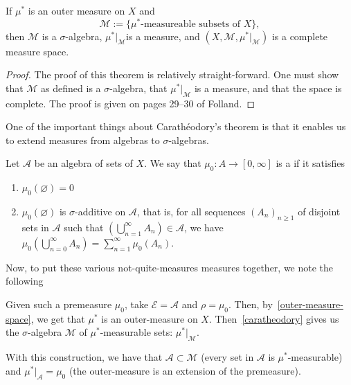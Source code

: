 \documentclass[11pt,leqno,oneside]{amsbook}
\numberwithin{thm}{section}
\renewcommand{\A}{\mathcal{A}} %
\newcommand{\M}{\mathcal{M}} %
\newcommand{\Ep}{\mathcal{E}} %
\newcommand{\s}{$\sigma$-} %
\renewcommand{\emptyset}{\varnothing}
\begin{document}
\begin{thm}[Carathéodory]\label{caratheodory}
  If $\mu^*$ is an outer measure on $X$ and \[
    \M := \{\mu^*\text{-measureable subsets of }X\},
  \]
  then $\M$ is a \s algebra, $\mu^*|_\M$is a measure, and
  $(X,\M,\mu^*|_\M)$ is a complete measure space.
\end{thm}
\begin{proof}
  The proof of this theorem is relatively straight-forward. One must
  show that $\M$ as defined is a \s algebra, that $\mu^*|_\M$ is
  a measure, and that the space is complete. The proof is given on
  pages 29--30 of Folland.
\end{proof}
One of the important things about Carathéodory's theorem is that it
enables us to extend measures from algebras to \s algebras.
\begin{defn}
  Let $\A$ be an algebra of sets of $X$. We say that $\mu_0 \colon A \to
  [0,\infty]$ is a  if it satisfies
  \begin{enumerate}
  \item $\mu_0(\emptyset) = 0$
  \item $\mu_0(\emptyset)$ is \s additive on $\A$, that is, for
    all sequences $(A_n)_{n \geq 1}$ of disjoint sets in $\A$ such
    that $\left(\bigcup_{n=1}^\infty A_n\right) \in \A$, we have $\mu_0\left(
      \bigcup_{n=0}^\infty A_n \right) = \sum_{n=1}^\infty
    \mu_0(A_n)$.
  \end{enumerate}
\end{defn}
Now, to put these various not-quite-measures measures together, we
note the following
\begin{rmk}
  Given such a premeasure $\mu_0$, take $\Ep = \A$ and $\rho =
  \mu_0$. Then, by~\ref{outer-measure-space}, we get that $\mu^*$ is
  an outer-measure on $X$. Then~\ref{caratheodory} gives us the \s algebra $\M$
  of $\mu^*$-measurable sets: $\mu^*|_\M$.
\end{rmk}
\begin{thm}\label{premeas-extension}
  With this construction, we have that $\A \subset \M$ (every set in $\A$ is $\mu^*$-measurable) and $\mu^*|_\A
  = \mu_0$ (the outer-measure is an extension of the premeasure).
\end{thm}
\end{document}
